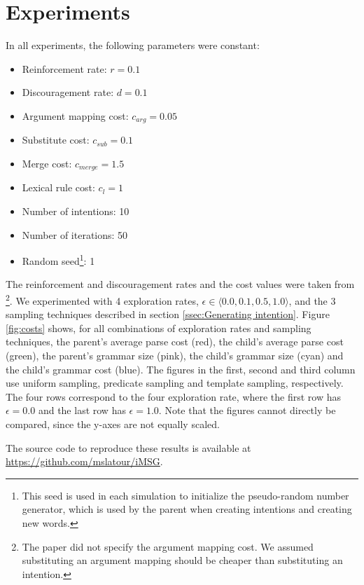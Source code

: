 \documentclass[a4paper]{article}
\begin{document}
\section{Experiments}
\label{sec:experiments}
In all experiments, the following parameters were constant:
\begin{itemize}
\item Reinforcement rate: $r = 0.1$
\item Discouragement rate: $d = 0.1$
\item Argument mapping cost: $c_{arg} = 0.05$
\item Substitute cost: $c_{sub} = 0.1$
\item Merge cost: $c_{merge} = 1.5$
\item Lexical rule cost: $c_l = 1$
\item Number of intentions: 10
\item Number of iterations: 50
\item Random seed\footnote{This seed is used in each simulation to initialize the pseudo-random number generator, which is used by the parent when creating intentions and creating new words.}: 1
\end{itemize}
The reinforcement and discouragement rates and the cost values were taken from \cite{batali1999negotiation}\footnote{The paper did not specify the argument mapping cost. We assumed substituting an argument mapping should be cheaper than substituting an intention.}. We experimented with 4 exploration rates, $\epsilon \in \langle 0.0, 0.1, 0.5, 1.0 \rangle$, and the 3 sampling techniques described in section \ref{ssec:Generating intention}. Figure \ref{fig:costs} shows, for all combinations of exploration rates and sampling techniques, the parent's average parse cost (red), the child's average parse cost (green), the parent's grammar size (pink), the child's grammar size (cyan) and the child's grammar cost (blue). The figures in the first, second and third column use uniform sampling, predicate sampling and template sampling, respectively. The four rows correspond to the four exploration rate, where the first row has $\epsilon = 0.0$ and the last row has $\epsilon = 1.0$. Note that the figures cannot directly be compared, since the y-axes are not equally scaled. 


The source code to reproduce these results is available at \url{https://github.com/mslatour/iMSG}.
\end{document}
